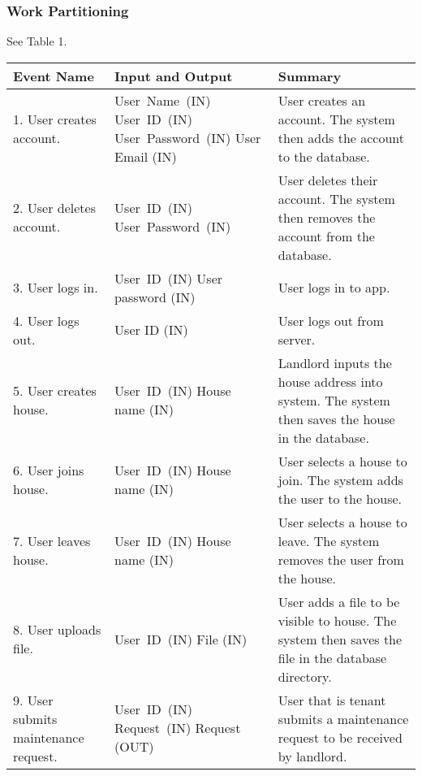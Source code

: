 \documentclass[12pt, titlepage]{article}
\begin{document}
\subsubsection{Work Partitioning} 
See Table 1.
\begin{table}
\begin{tabular}{|p{5cm}|p{5cm}|p{5cm}|}
\hline
\textbf{Event Name}  & \textbf{Input and Output} & \textbf{Summary} \\ 
\hline
1. User creates account. & \mbox{User Name (IN)} \linebreak \mbox{User ID (IN)} \linebreak \mbox{User Password (IN)} \linebreak User Email (IN) & User creates an account. The system then adds the account to the database. \\ 
\hline
2. User deletes account. & \mbox{User ID (IN)} \linebreak \mbox{User Password (IN)} & User deletes their account. The system then removes the account from the database. \\ 
\hline
3. User logs in. & \mbox{User ID (IN)} \linebreak User password (IN) & User logs in to app. \\ 
\hline
4. User logs out. & User ID (IN) & User logs out from server. \\
\hline
5. User creates house. & \mbox{User ID (IN)} \linebreak House name (IN) & Landlord inputs the house address into system. The system then saves the house in the database. \\
\hline
6. User joins house. & \mbox{User ID (IN)} \linebreak House name (IN) & User selects a house to join. The system adds the user to the house. \\
\hline
7. User leaves house. & \mbox{User ID (IN)} \linebreak House name (IN) & User selects a house to leave. The system removes the user from the house. \\
\hline
8. User uploads file. & \mbox{User ID (IN)} \linebreak File (IN) & User adds a file to be visible to house. The system then saves the file in the database directory. \\
\hline
9. User submits maintenance request. & \mbox{User ID (IN)} \linebreak \mbox{Request (IN)} \linebreak Request (OUT) & User that is tenant submits a maintenance request to be received by landlord. \\

\end{tabular}
\end{table}
\end{document}
